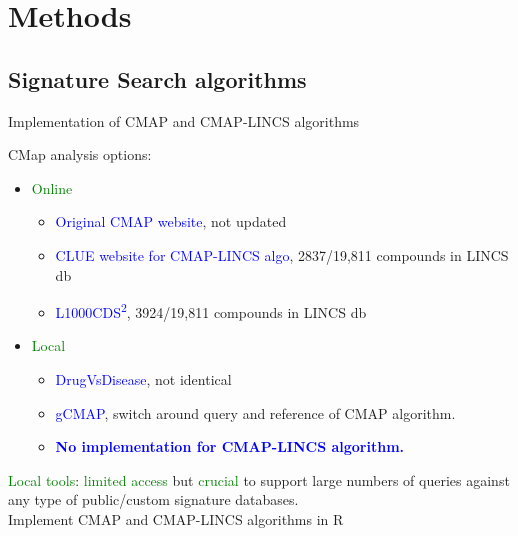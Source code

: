 \documentclass[10pt]{beamer}
\begin{document}
\section{Methods}
\subsection{Signature Search algorithms}
\begin{frame}{Implementation of CMAP and CMAP-LINCS algorithms}
\vspace{-0.4cm}
    \begin{exampleblock}{CMap analysis options:}
    	\begin{itemize}
    	    \item \textcolor{green}{Online}
    	        \begin{itemize}
    	            \item \textcolor{blue}{Original CMAP website}, not updated
    	            \item \textcolor{blue}{CLUE website for CMAP-LINCS algo}, 2837/19,811 compounds in LINCS db
    	            \item \textcolor{blue}{L1000CDS\textsuperscript{2}}, 3924/19,811 compounds in LINCS db
    	        \end{itemize}
    	    \item \textcolor{green}{Local}
    	        \begin{itemize}
    	            \item \textcolor{blue}{DrugVsDisease}, not identical
    	            \item \textcolor{blue}{gCMAP}, switch around query and reference of CMAP algorithm.
    	            \item \textbf{\textcolor{blue}{No implementation for CMAP-LINCS algorithm.}}
    	        \end{itemize}
    	\end{itemize}
    \end{exampleblock}
\textcolor{green}{Local tools}: \textcolor{green}{limited access} but \textcolor{green}{crucial} to support large numbers of queries against any type of public/custom signature databases. \\
\alert{Implement CMAP and CMAP-LINCS algorithms in R}
\end{frame}
\end{document}
